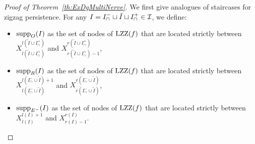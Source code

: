 \begin{proof}[Proof of Theorem~\ref{th:ExDgMultiNerve}]
We first give analogues of staircases for zigzag persistence. For any $I=I_\cap^-\sqcup \tilde I \sqcup I_\cap^+\in\mathcal{I}$, we define:
\begin{itemize}
\item ${\rm supp}_O(I)$ as the set of nodes of $\mathrm{LZZ}(f)$ that are located strictly between 
$X_{l(\tilde I\cup I_\cap^+)}^{l(\tilde I\cup I_\cap^+)}$ and $X_{r(\tilde I\cup I_\cap^+)-1}^{r(\tilde I\cup I_\cap^+)}$,
\item ${\rm supp}_R(I)$ as the set of nodes of $\mathrm{LZZ}(f)$ that are located strictly between 
$X_{l(I_\cap^-\cup \tilde I)}^{l(I_\cap^-\cup \tilde I)+1}$ and $X_{r(I_\cap^-\cup \tilde I)}^{r(I_\cap^-\cup \tilde I)}$, 
\item ${\rm supp}_{E^-}(I)$ as the set of nodes of $\mathrm{LZZ}(f)$ that are located strictly between $X_{l(I)}^{l(I)+1}$ and $X_{r(I)-1}^{r(I)}$. 
\end{itemize}




\end{proof}

